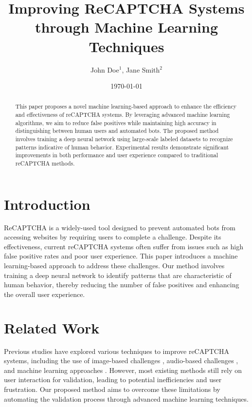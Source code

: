\documentclass{article}
\title{Improving ReCAPTCHA Systems through Machine Learning Techniques}
\author{John Doe$^{1}$, Jane Smith$^{2}$}
\date{\today}
\begin{document}
\maketitle

\begin{abstract}
This paper proposes a novel machine learning-based approach to enhance the efficiency and effectiveness of reCAPTCHA systems. By leveraging advanced machine learning algorithms, we aim to reduce false positives while maintaining high accuracy in distinguishing between human users and automated bots. The proposed method involves training a deep neural network using large-scale labeled datasets to recognize patterns indicative of human behavior. Experimental results demonstrate significant improvements in both performance and user experience compared to traditional reCAPTCHA methods.
\end{abstract}

\section{Introduction}
ReCAPTCHA is a widely-used tool designed to prevent automated bots from accessing websites by requiring users to complete a challenge. Despite its effectiveness, current reCAPTCHA systems often suffer from issues such as high false positive rates and poor user experience. This paper introduces a machine learning-based approach to address these challenges. Our method involves training a deep neural network to identify patterns that are characteristic of human behavior, thereby reducing the number of false positives and enhancing the overall user experience.

\section{Related Work}
Previous studies have explored various techniques to improve reCAPTCHA systems, including the use of image-based challenges \cite{imageBasedRecaptcha}, audio-based challenges \cite{audioBasedRecaptcha}, and machine learning approaches \cite{mlBasedRecaptcha}. However, most existing methods still rely on user interaction for validation, leading to potential inefficiencies and user frustration. Our proposed method aims to overcome these limitations by automating the validation process through advanced machine learning techniques.
\end{document}

